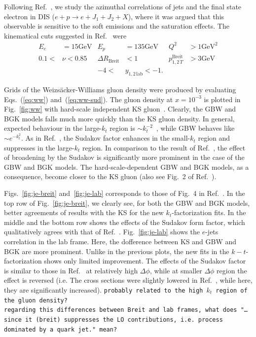 \documentclass[a4,12pt]{article}
\newcommand{\GeV}[0]{\mathrm{GeV}}
\newcommand{\comment}[1]{\texttt{\color{red}#1}}
\begin{document}
Following Ref.~\cite{vanHameren:2021sqc}, we study the azimuthal correlations of jets and the final state electron in DIS ($e+p\rightarrow e+J_1+J_2+X$), where it was argued that this observable is sensitive to the soft emissions and the saturation effects. 
The kinematical cuts suggested in Ref.~\cite{vanHameren:2021sqc} were
\begin{align*}
	E_e&=15\GeV& E_p&=135\GeV& Q^2&>1\GeV^2\\
	0.1<&\nu<0.85&\Delta R_{\mathrm{Breit}}&<1&p^{\mathrm{Breit}}_{1,2\,T}&>3\GeV\\
	&&-4<&y_{1,2\,\mathrm{lab}}<-1.&&
\end{align*}

Grids of the Weizs\"acker-Williams gluon density were produced by evaluating Eqs.~(\ref{eq:ww}) and~(\ref{eq:ww-sud}).
The gluon density at $x=10^{-3}$ is plotted in Fig.~\ref{fig:ww} with hard-scale independent KS gluon~\cite{vanHameren:2021sqc}. Clearly, the GBW and BGK models falls much more quickly than the KS gluon density. In general, expected behaviour in the large-$k_t$ region is $\sim k_t^{-2}$~\cite{Dominguez:2010xd,Dominguez:2011wm}, while GBW behaves like $\sim e^{-k_t^2}$.
As in Ref.~\cite{vanHameren:2021sqc}, the Sudakov factor enhances in the small-$k_t$ region and suppresses in the large-$k_t$ region. In comparison to the result of Ref.~\cite{vanHameren:2021sqc}, the effect of broadening by the Sudakov is significantly more prominent in the case of the GBW and BGK models. The hard-scale-dependent GBW and BGK models, as a consequence, become closer to the KS gluon (also see Fig.~2 of Ref.~\cite{vanHameren:2021sqc}).  

Figs.~\ref{fig:je-breit} and~\ref{fig:je-lab} corresponds to those of Fig.~4 in Ref.~\cite{vanHameren:2021sqc}. 
In the top row of Fig.~\ref{fig:je-breit}, we clearly see, for both the GBW and BGK models, better agreements of results with the KS for the new $k_t$-factorization fits. In the middle and the bottom row shows the effects of the Sudakov form factor, which qualitatively agrees with that of Ref.~\cite{vanHameren:2021sqc}.
Fig.~\ref{fig:je-lab} shows the $e$-jets correlation in the lab frame. Here, the dofference between KS and GBW and BGK are more prominent. Unlike in the previous plots, the new fits in the $k-t$-factorization shows only limited improvement.
The effects of the Sudakov factor is similar to those in Ref.~\cite{vanHameren:2021sqc} at relatively high $\Delta \phi$, while at smaller $\Delta \phi$ region the effect is reversed (i.e. The cross sections were slightly lowered in Ref.~\cite{vanHameren:2021sqc}, while here, they are significantly increased). \comment{probably related to the high $k_t$ region of the gluon density?}\\
\comment{regarding this differences between Breit and lab frames, what does "\dots since it (breit) suppresses the LO contributions, i.e. process dominated by a quark jet." mean?}
\end{document}
